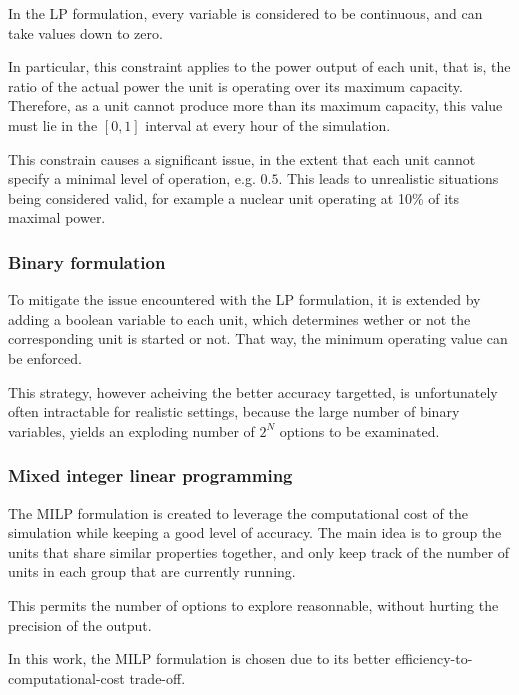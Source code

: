 In the LP formulation, every variable is considered to be continuous, and can take values down to zero.

In particular, this constraint applies to the power output of each unit, that is, the ratio of the actual power the unit is operating over its maximum capacity. Therefore, as a unit cannot produce more than its maximum capacity, this value must lie in the $[0, 1]$ interval at every hour of the simulation.

This constrain causes a significant issue, in the extent that each unit cannot specify a minimal level of operation, e.g. $0.5$. This leads to unrealistic situations being considered valid, for example a nuclear unit operating at 10\% of its maximal power.

\subsubsection{Binary formulation}

To mitigate the issue encountered with the LP formulation, it is extended by adding a boolean variable to each unit, which determines wether or not the corresponding unit is started or not. That way, the minimum operating value can be enforced.

This strategy, however acheiving the better accuracy targetted, is unfortunately often intractable for realistic settings, because the large number of binary variables, yields an exploding number of $2^N$ options to be examinated.

\subsubsection{Mixed integer linear programming \label{subsubsection:milp}}

The MILP formulation is created to leverage the computational cost of the simulation while keeping a good level of accuracy. The main idea is to group the units that share similar properties together, and only keep track of the number of units in each group that are currently running.

This permits the number of options to explore reasonnable, without hurting the precision of the output.

In this work, the MILP formulation is chosen due to its better efficiency-to-computational-cost trade-off.